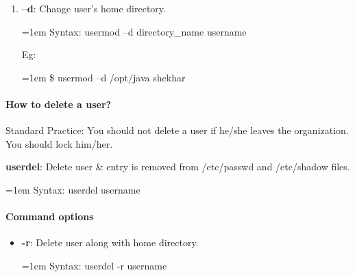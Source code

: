 \begin{flushleft}
\begin{enumerate}[label=(\alph*)]
	
		\item \textbf{–d}: Change user’s home directory.
		\bigskip
		\begin{tcolorbox}[breakable,notitle,boxrule=0pt,colback=pink,colframe=pink]
			\color{black}
			\font=1em
			Syntax: usermod –d directory\_name username
			\font=4pt
		\end{tcolorbox}
		Eg:
		\bigskip
		\begin{tcolorbox}[breakable,notitle,boxrule=-0pt,colback=black,colframe=black]
			\color{green}
			\font=1em
			\$ usermod –d /opt/java shekhar
			\font=4pt
		\end{tcolorbox}
	\end{enumerate}

\bigskip
\bigskip

\newpage
	
\paragraph{How to delete a user?}

\bigskip
\begin{tcolorbox}[breakable,notitle,boxrule=-0pt,colback=red,colframe=red]
	\color{white}
	Standard Practice: You should not delete a user if he/she leaves the organization. You
	should lock him/her.
\end{tcolorbox}
	


\textbf{userdel}: Delete user \& entry is removed from /etc/passwd and /etc/shadow files.
	\begin{tcolorbox}[breakable,notitle,boxrule=0pt,colback=pink,colframe=pink]
		\color{black}
		\font=1em
		Syntax: userdel username
		\font=4pt
	\end{tcolorbox}
	\paragraph{Command options}
	\begin{itemize}
		\item \textbf{-r}: Delete user along with home directory.
		\begin{tcolorbox}[breakable,notitle,boxrule=0pt,colback=pink,colframe=pink]
			\color{black}
			\font=1em
			Syntax: userdel -r username
			\font=4pt
		\end{tcolorbox}
	\end{itemize}

\end{flushleft}

\newpage


